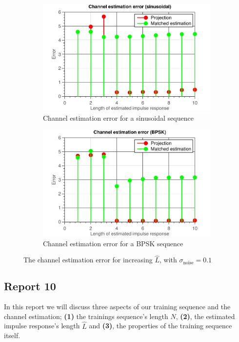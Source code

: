 \documentclass[11pt,titlepage]{report}
\begin{document}
\begin{figure}[H]
\begin{subfigure}{0.49\textwidth}
		\includegraphics[width=\textwidth]{../../deliverable-7-resources/figures/ass-1/report-8-9-10/report-9-noise-0.1/ass-1-report-9-sinusoidal.pdf}
		\caption{\centering Channel estimation error for a sinusoidal sequence}
	\end{subfigure}
	\begin{subfigure}{0.49\textwidth}
		\includegraphics[width=\textwidth]{../../deliverable-7-resources/figures/ass-1/report-8-9-10/report-9-noise-0.1/ass-1-report-9-BPSK.pdf}
		\caption{\centering Channel estimation error for a BPSK sequence}
	\end{subfigure}
	\caption{The channel estimation error for increasing $\hat{L}$, with $\sigma_{\text{noise}} = 0.1$}
	\label{fig:ass-1-rep-9-0.1}
\end{figure}


\subsection{Report 10}
\label{subsec:ass-1-rep-10}
In this report we will discuss three aspects of our training sequence and the channel estimation; \textbf{(1)} the trainings sequence's length $N$, \textbf{(2)}, the estimated impulse response's length $\hat{L}$ and \textbf{(3)}, the properties of the training sequence itself.
\end{document}
